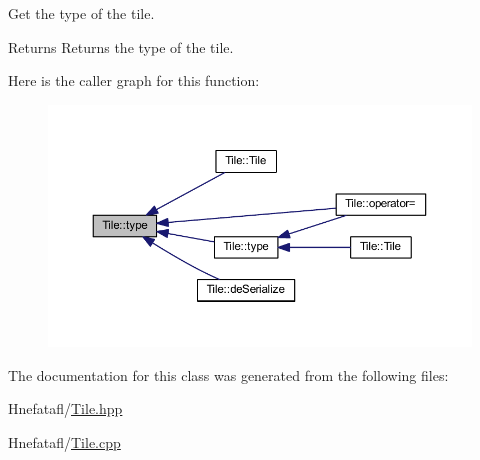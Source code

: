 Get the type of the tile. 

\begin{DoxyReturn}{Returns}
Returns the type of the tile. 
\end{DoxyReturn}


Here is the caller graph for this function\-:\nopagebreak
\begin{figure}[H]
\begin{center}
\leavevmode
\includegraphics[width=350pt]{class_tile_a816fb8e2d8d48619eccf6e225eca7206_icgraph}
\end{center}
\end{figure}




The documentation for this class was generated from the following files\-:\begin{DoxyCompactItemize}
\item 
Hnefatafl/\hyperlink{_tile_8hpp}{Tile.\-hpp}\item 
Hnefatafl/\hyperlink{_tile_8cpp}{Tile.\-cpp}\end{DoxyCompactItemize}
